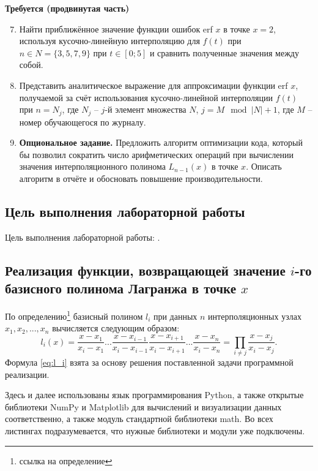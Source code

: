 \textbf{Требуется (продвинутая часть)}
\begin{enumerate}
    \setcounter{enumi}{6}
    \item Найти приближённое значение функции ошибок erf $x$ в точке $x = 2$, используя кусочно-линейную интерполяцию для $f(t)$ при $n \in N = \{3, 5, 7, 9\}$ при $t \in [0; 5]$ и сравнить полученные значения между собой.
    \item Представить аналитическое выражение для аппроксимации функции erf $x$, получаемой за счёт использования кусочно-линейной интерполяции $f(t)$ при $n = N_j$, где $N_j$ – $j$-й элемент множества $N$, $j = M \mod{\vert N \vert}+1$, где $M$ – номер обучающегося по журналу.
    \item \textbf{Опциональное задание.} Предложить алгоритм оптимизации кода, который бы позволил сократить число арифметических операций при вычислении значения интерполяционного полинома $L_{n−1}(x)$ в точке $x$. Описать алгоритм в отчёте и обосновать повышение производительности.
\end{enumerate}


\subsection*{Цель выполнения лабораторной работы}

Цель выполнения лабораторной работы: \GoalOfResearch.

\subsection{Реализация функции, возвращающей значение $i$-го базисного полинома Лагранжа в точке $x$}
\label{z1}

По определению\footnote{ссылка на определение} базисный полином $l_i$ при данных $n$ интерполяционных узлах $x_1, x_2,...,x_n$ вычисляется следующим образом:
\begin{equation}
    l_i(x) = \frac{x - x_1}{x_i-x_1}...
    \frac{x - x_{i-1}}{x_i-x_{i-1}}
    \frac{x - x_{i+1}}{x_i-x_{i+1}}...
    \frac{x - x_{n}}{x_i-x_{n}} = \prod_{i \ne j}\frac{x-x_j}{x_i-x_j}.
\label{eq:l_i}
\end{equation}
Формула \eqref{eq:l_i} взята за основу решения поставленной задачи программной реализации.

Здесь и далее использованы язык программирования Python, а также открытые библиотеки NumPy и Matplotlib для вычислений и визуализации данных соответственно, а также модуль стандартной библиотеки math. Во всех листингах подразумевается, что нужные библиотеки и модули уже подключены.

